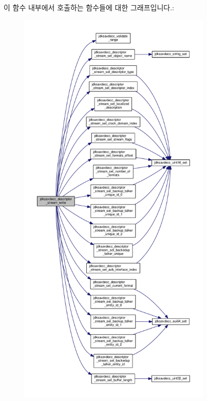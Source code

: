 이 함수 내부에서 호출하는 함수들에 대한 그래프입니다.\+:
\nopagebreak
\begin{figure}[H]
\begin{center}
\leavevmode
\includegraphics[height=550pt]{group__descriptor__stream_ga0307af9834e47b25feaae00c72675d2c_cgraph}
\end{center}
\end{figure}


